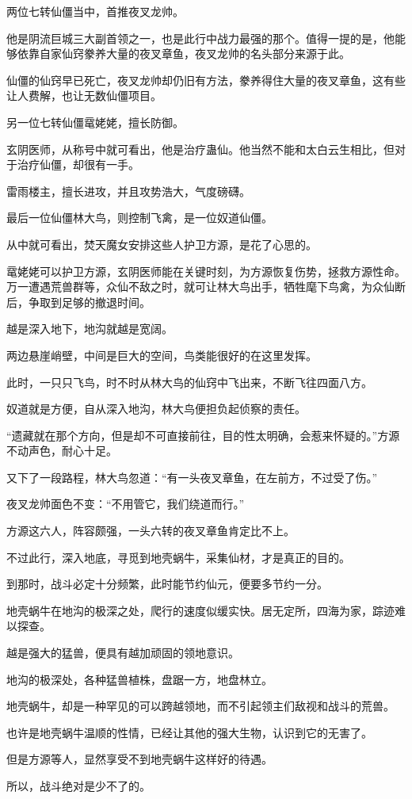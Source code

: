 \begin{this_body}
两位七转仙僵当中，首推夜叉龙帅。

他是阴流巨城三大副首领之一，也是此行中战力最强的那个。值得一提的是，他能够依靠自家仙窍豢养大量的夜叉章鱼，夜叉龙帅的名头部分来源于此。

仙僵的仙窍早已死亡，夜叉龙帅却仍旧有方法，豢养得住大量的夜叉章鱼，这有些让人费解，也让无数仙僵项目。

另一位七转仙僵鼋姥姥，擅长防御。

玄阴医师，从称号中就可看出，他是治疗蛊仙。他当然不能和太白云生相比，但对于治疗仙僵，却很有一手。

雷雨楼主，擅长进攻，并且攻势浩大，气度磅礴。

最后一位仙僵林大鸟，则控制飞禽，是一位奴道仙僵。

从中就可看出，焚天魔女安排这些人护卫方源，是花了心思的。

鼋姥姥可以护卫方源，玄阴医师能在关键时刻，为方源恢复伤势，拯救方源性命。万一遭遇荒兽群等，众仙不敌之时，就可让林大鸟出手，牺牲麾下鸟禽，为众仙断后，争取到足够的撤退时间。

越是深入地下，地沟就越是宽阔。

两边悬崖峭壁，中间是巨大的空间，鸟类能很好的在这里发挥。

此时，一只只飞鸟，时不时从林大鸟的仙窍中飞出来，不断飞往四面八方。

奴道就是方便，自从深入地沟，林大鸟便担负起侦察的责任。

“遗藏就在那个方向，但是却不可直接前往，目的性太明确，会惹来怀疑的。”方源不动声色，耐心十足。

又下了一段路程，林大鸟忽道：“有一头夜叉章鱼，在左前方，不过受了伤。”

夜叉龙帅面色不变：“不用管它，我们绕道而行。”

方源这六人，阵容颇强，一头六转的夜叉章鱼肯定比不上。

不过此行，深入地底，寻觅到地壳蜗牛，采集仙材，才是真正的目的。

到那时，战斗必定十分频繁，此时能节约仙元，便要多节约一分。

地壳蜗牛在地沟的极深之处，爬行的速度似缓实快。居无定所，四海为家，踪迹难以探查。

越是强大的猛兽，便具有越加顽固的领地意识。

地沟的极深处，各种猛兽植株，盘踞一方，地盘林立。

地壳蜗牛，却是一种罕见的可以跨越领地，而不引起领主们敌视和战斗的荒兽。

也许是地壳蜗牛温顺的性情，已经让其他的强大生物，认识到它的无害了。

但是方源等人，显然享受不到地壳蜗牛这样好的待遇。

所以，战斗绝对是少不了的。

\end{this_body}

